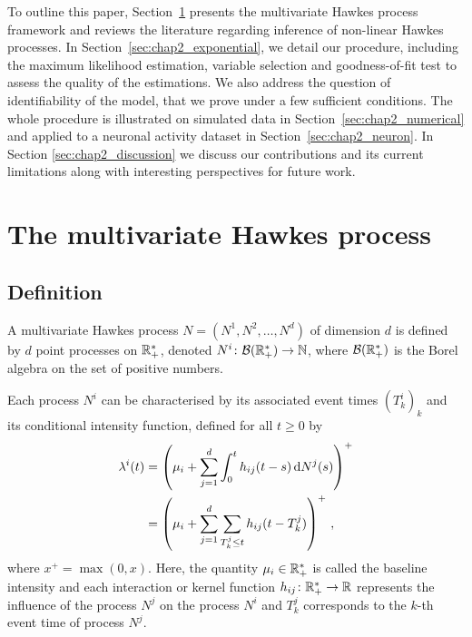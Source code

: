 To outline this paper, Section~\ref{sec:chap2_presentation} presents the multivariate Hawkes process framework and reviews the literature regarding inference of non-linear Hawkes processes.
In Section~\ref{sec:chap2_exponential}, we detail our procedure, including the maximum likelihood estimation, variable selection and goodness-of-fit test to assess the quality of the estimations. We also address the question of identifiability of the model, that we prove under a few sufficient conditions. 
The whole procedure is illustrated on simulated data in Section~\ref{sec:chap2_numerical} and applied to a neuronal activity dataset in Section~\ref{sec:chap2_neuron}. In Section \ref{sec:chap2_discussion} we discuss our contributions and its current limitations along with interesting perspectives for future work.

\section{The multivariate Hawkes process}\label{sec:chap2_presentation}
    \subsection{Definition}
    A multivariate Hawkes process $N = (N^1, N^2, \ldots, N^d)$ of dimension $d$ is defined by $d$ point processes on ${\mathbb R}_+^*$, denoted $N^i\colon \mathcal B({\mathbb R}_+^*) \to {\mathbb N}$, where $\mathcal{B}({\mathbb R}_+^*)$ is the Borel algebra on the set of positive numbers.

    Each process $N^i$ can be characterised by its associated event times $\left(T_k^i\right)_k$ and its conditional intensity function, defined for all \(t \ge 0\) by
    \begin{align}
    \lambda^i(t) &= \left(\mu_i + \sum_{j=1}^{d}{\int_{0}^{t}{h_{ij}(t-s)\,\mathrm{d}N^j(s)}}\right)^+\nonumber\\ &= \left(\mu_i + \sum_{j=1}^{d}\sum_{T_k^j \leq t}{h_{ij}(t-T^j_k)}\right)^+\label{eq:chap2_dimensional_c_intensity}\,,
    \end{align}
    where
    $x^+ = \max{(0,x)}$.
    Here, the quantity $\mu_i\in{\mathbb R}_+^*$ is called the baseline intensity and each interaction or kernel function $h_{ij}\colon {\mathbb R}_+^* \to {\mathbb R}$ represents the influence of the process $N^j$ on the process $N^i$ and $T^j_k$ corresponds to the $k$-th event time of process $N^j$.

